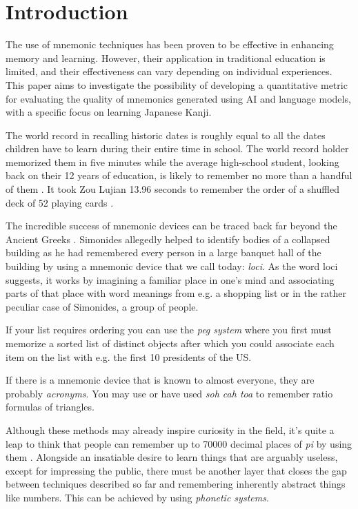 \section{Introduction} \label{sec:body_motivation}

The use of mnemonic techniques has been proven to be effective in enhancing memory and learning. However, their application in traditional education is limited, and their effectiveness can vary depending on individual experiences. This paper aims to investigate the possibility of developing a quantitative metric for evaluating the quality of mnemonics generated using AI and language models, with a specific focus on learning Japanese Kanji.

The world record in recalling historic dates is roughly equal to all the dates children have to learn during their entire time in school. The world record holder memorized them in five minutes while the average high-school student, looking back on their 12 years of education, is likely to remember no more than a handful of them \cite{how_to_become_a_memory_master}. It took Zou Lujian 13.96 seconds to remember the order of a shuffled deck of 52 playing cards \cite{record_recall_playing_cards}.

The incredible success of mnemonic devices can be traced back far beyond the Ancient Greeks \cite{white_2014}. Simonides allegedly helped to identify bodies of a collapsed building as he had remembered every person in a large banquet hall of the building by using a mnemonic device that we call today: \emph{loci}. As the word loci suggests, it works by imagining a familiar place in one's mind and associating parts of that place with word meanings from e.g. a shopping list or in the rather peculiar case of Simonides, a group of people.

If your list requires ordering you can use the \emph{peg system} where you first must memorize a sorted list of distinct objects after which you could associate each item on the list with e.g. the first 10 presidents of the US.

If there is a mnemonic device that is known to almost everyone, they are probably \emph{acronyms}. You may use or have used \emph{soh cah toa} to remember ratio formulas of triangles.

Although these methods may already inspire curiosity in the field, it's quite a leap to think that people can remember up to 70000 decimal places of \emph{pi} by using them \cite{record_decimal_pi}. Alongside an insatiable desire to learn things that are arguably useless, except for impressing the public, there must be another layer that closes the gap between techniques described so far and remembering inherently abstract things like numbers. This can be achieved by using \emph{phonetic systems}.


